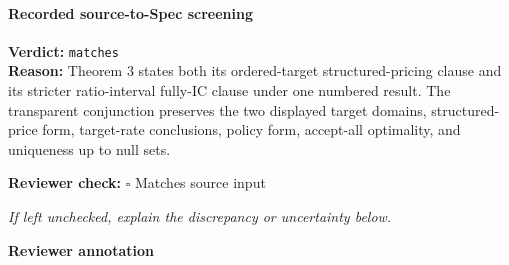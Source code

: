 \documentclass[10pt]{article}
\newcommand{\reviewerbox}{%
  \par\noindent\fbox{\parbox{0.96\linewidth}{\rule{0pt}{0.38in}}}\par
}
\newcommand{\reviewmatch}[1]{%
  \par\noindent\textbf{Reviewer check:} $\square$\; #1\par
  \noindent\emph{If left unchecked, explain the discrepancy or uncertainty below.}\par
}
\begin{document}
\paragraph{Recorded source-to-Spec screening}
\textbf{Verdict:} \texttt{matches}
\\
\textbf{Reason:} Theorem 3 states both its ordered-target structured-pricing clause and its stricter ratio-interval fully-IC clause under one numbered result. The transparent conjunction preserves the two displayed target domains, structured-price form, target-rate conclusions, policy form, accept-all optimality, and uniqueness up to null sets.
\reviewmatch{Matches source input}
\noindent\textbf{Reviewer annotation}\par
\reviewerbox
\end{document}
